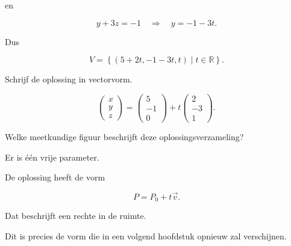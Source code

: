 \documentclass{ximera}
\begin{document}
\begin{oefening}{\oefU\ESS}
\begin{question}
\begin{oplossing}
en

\[
y+3z=-1
\quad\Longrightarrow\quad
y=-1-3t.
\]

Dus

\[
V=
\left\{
(5+2t,-1-3t,t)
\mid t\in\mathbb{R}
\right\}.
\]

\end{oplossing}

\end{question}


\begin{question}

Schrijf de oplossing in vectorvorm.

\begin{oplossing}

\[
\begin{pmatrix}
x\\y\\z
\end{pmatrix}
=
\begin{pmatrix}
5\\-1\\0
\end{pmatrix}
+
t
\begin{pmatrix}
2\\-3\\1
\end{pmatrix}.
\]

\end{oplossing}

\end{question}


\begin{question}

Welke meetkundige figuur beschrijft deze oplossingsverzameling?

\begin{multipleChoice}
\end{multipleChoice}

\begin{oplossing}

Er is één vrije parameter.

De oplossing heeft de vorm

\[
P=P_0+t\vec{v}.
\]

Dat beschrijft een rechte in de ruimte.

Dit is precies de vorm die in een volgend hoofdstuk opnieuw zal verschijnen.

\end{oplossing}

\end{question}

\end{oefening}
\end{document}
